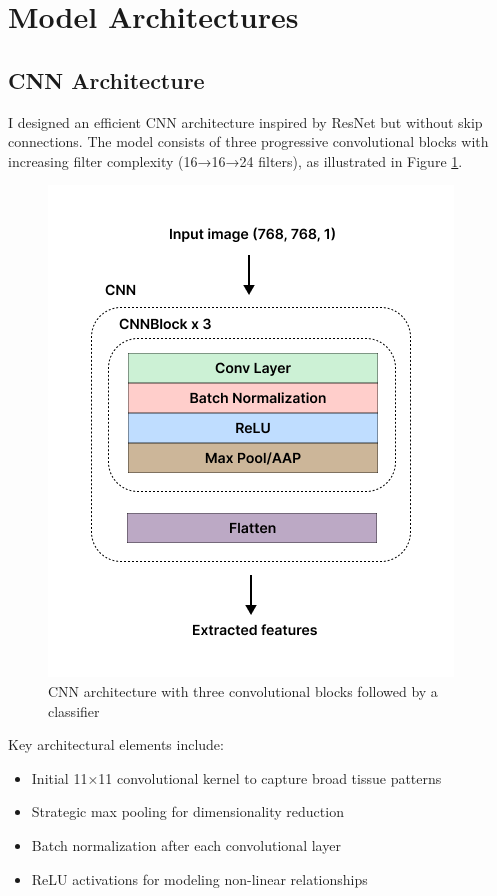 \documentclass[10pt,twocolumn]{article}
\begin{document}
\section{Model Architectures}
\subsection{CNN Architecture}
I designed an efficient CNN architecture inspired by ResNet but without skip connections. The model consists of three progressive convolutional blocks with increasing filter complexity (16→16→24 filters), as illustrated in Figure \ref{fig:cnn_arch}.

\begin{figure}[h]
\centering
\includegraphics[width=0.9\columnwidth]{imgs/cnn_arch.png}
\caption{CNN architecture with three convolutional blocks followed by a classifier}
\label{fig:cnn_arch}
\end{figure}

Key architectural elements include:
\begin{itemize}
    \item Initial 11×11 convolutional kernel to capture broad tissue patterns
    \item Strategic max pooling for dimensionality reduction
    \item Batch normalization after each convolutional layer
    \item ReLU activations for modeling non-linear relationships
\end{itemize}
\end{document}
